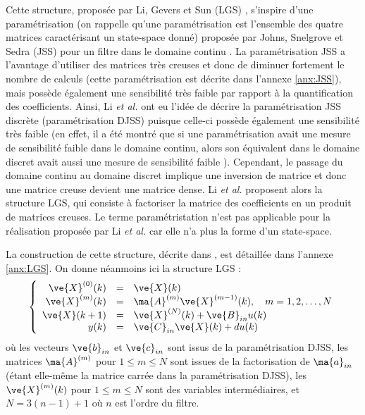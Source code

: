 Cette structure, proposée par Li, Gevers et Sun (LGS) \cite{LGS00}, s'inspire d'une paramétrisation (on rappelle qu'une paramétrisation est l'ensemble des quatre matrices caractérisant un state-space donné) proposée par Johns, Snelgrove et Sedra (JSS) pour un filtre dans le domaine continu \cite{JSS89}. La paramétrisation JSS a l'avantage d'utiliser des matrices très creuses et donc de diminuer fortement le nombre de calculs (cette paramétrisation est décrite dans l'annexe \ref{anx:JSS}), mais possède également une sensibilité très faible par rapport à la quantification des coefficients. Ainsi, Li \emph{et al.} ont eu l'idée de décrire la paramétrisation JSS discrète (paramétrisation DJSS) puisque celle-ci possède également une sensibilité très faible (en effet, il a été montré que si une paramétrisation avait une mesure de sensibilité faible dans le domaine continu, alors son équivalent dans le domaine discret avait aussi une mesure de sensibilité faible \cite{LuHa88}). Cependant, le passage du domaine continu au domaine discret implique une inversion de matrice et donc une matrice creuse devient une matrice dense. Li \emph{et al.} proposent alors la structure LGS, qui consiste à factoriser la matrice des coefficients en un produit de matrices creuses. Le terme paramétristation n'est pas applicable pour la réalisation proposée par Li \emph{et al.} car elle n'a plus la forme d'un state-space. 

La construction de cette structure, décrite dans \cite{LGS00}, est détaillée dans l'annexe \ref{anx:LGS}. On donne néanmoins ici la structure LGS :
\begin{equation*}
\left \{
\begin{array}{rcl}
\ve{X}^{(0)}(k)&=&\ve{X}(k)\\
\ve{X}^{(m)}(k) & = & \ma{A}^{(m)}\ve{X}^{(m-1)}(k), \quad m=1,2,\ldots,N\\
\ve{X}(k+1) & = & \ve{X}^{(N)}(k)+\ve{B}_{in}u(k) \\
y(k)& = & \ve{C}_{in}\ve{X}(k)+du(k)\\
\end{array}
\right .
\end{equation*}
où les vecteurs $\ve{b}_{in}$ et $\ve{c}_{in}$ sont issus de la paramétrisation DJSS, les matrices $\ma{A}^{(m)}$ pour $1\leq m \leq N$ sont issues de la factorisation de $\ma{a}_{in}$ (étant elle-même la matrice carrée dans la paramétrisation DJSS), les $\ve{X}^{(m)}(k)$  pour $1\leq m \leq N$ sont des variables intermédiaires, et $N = 3(n-1)+1$ où $n$ est l'ordre du filtre.


